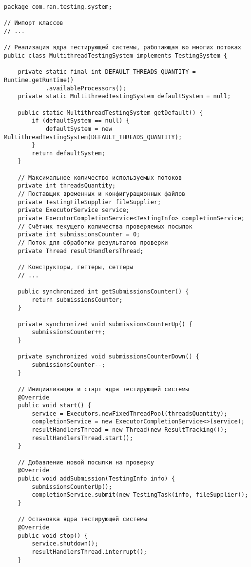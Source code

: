 \begin{verbatim}
package com.ran.testing.system;

// Импорт классов
// ...

// Реализация ядра тестирующей системы, работающая во многих потоках
public class MultithreadTestingSystem implements TestingSystem {

    private static final int DEFAULT_THREADS_QUANTITY = Runtime.getRuntime()
            .availableProcessors();
    private static MultithreadTestingSystem defaultSystem = null;
    
    public static MultithreadTestingSystem getDefault() {
        if (defaultSystem == null) {
            defaultSystem = new MultithreadTestingSystem(DEFAULT_THREADS_QUANTITY);
        }
        return defaultSystem;
    }
    
    // Максимальное количество используемых потоков
    private int threadsQuantity;
    // Поставщик временных и конфигурационных файлов
    private TestingFileSupplier fileSupplier;
    private ExecutorService service;
    private ExecutorCompletionService<TestingInfo> completionService;
    // Счётчик текущего количества проверяемых посылок
    private int submissionsCounter = 0;
    // Поток для обработки результатов проверки
    private Thread resultHandlersThread;

    // Конструкторы, геттеры, сеттеры
    // ...

    public synchronized int getSubmissionsCounter() {
        return submissionsCounter;
    }
    
    private synchronized void submissionsCounterUp() {
        submissionsCounter++;
    }
    
    private synchronized void submissionsCounterDown() {
        submissionsCounter--;
    }
    
    // Инициализация и старт ядра тестирующей системы
    @Override
    public void start() {
        service = Executors.newFixedThreadPool(threadsQuantity);
        completionService = new ExecutorCompletionService<>(service);
        resultHandlersThread = new Thread(new ResultTracking());
        resultHandlersThread.start();
    }

    // Добавление новой посылки на проверку
    @Override
    public void addSubmission(TestingInfo info) {
        submissionsCounterUp();
        completionService.submit(new TestingTask(info, fileSupplier));
    }

    // Остановка ядра тестирующей системы
    @Override
    public void stop() {
        service.shutdown();
        resultHandlersThread.interrupt();
    }
    

\end{verbatim}
